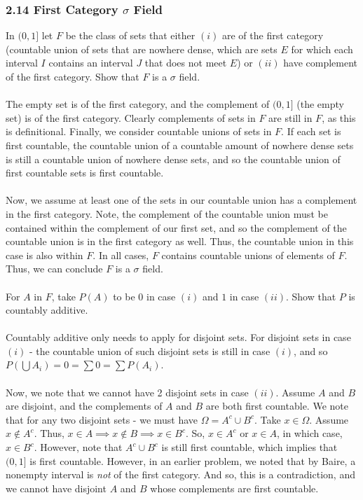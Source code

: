\documentclass[12pt,a4paper]{article}
\newcommand{\1}[1]{\mathbbm{1}\left\{ #1 \right\}}
\begin{document}
\subsubsection{2.14 First Category $\sigma$ Field} In $(0,1]$ let $F$ be the class of sets that either $(i)$ are of the first category (countable union of sets that are nowhere dense, which are sets $E$ for which each interval $I$ contains an interval $J$ that does not meet $E$) or $(ii)$ have complement of the first category. Show that $F$ is a $\sigma$ field.
\\\\
The empty set is of the first category, and the complement of $(0,1]$ (the empty set) is of the first category. Clearly complements of sets in $F$ are still in $F$, as this is definitional. Finally, we consider countable unions of sets in $F$. If each set is first countable, the countable union of a countable amount of nowhere dense sets is still a countable union of nowhere dense sets, and so the countable union of first countable sets is first countable.
\\\\
Now, we assume at least one of the sets in our countable union has a complement in the first category. Note, the complement of the countable union must be contained within the complement of our first set, and so the complement of the countable union is in the first category as well. Thus, the countable union in this case is also within $F$. In all cases, $F$ contains countable unions of elements of $F$. Thus, we can conclude $F$ is a $\sigma$ field.
\\\\
For $A$ in $F$, take $P(A)$ to be $0$ in case $(i)$ and $1$ in case $(ii)$. Show that $P$ is countably additive.
\\\\
Countably additive only needs to apply for disjoint sets. For disjoint sets in case $(i)$ - the countable union of such disjoint sets is still in case $(i)$, and so $P(\bigcup A_i) = 0 = \sum 0 = \sum P(A_i)$.
\\\\
Now, we note that we cannot have 2 disjoint sets in case $(ii)$. Assume $A$ and $B$ are disjoint, and the complements of $A$ and $B$ are both first countable. We note that for any two disjoint sets - we must have $\Omega = A^c \cup B^c$. Take $x \in \Omega$. Assume $x \not\in A^c$. Thus, $x \in A \implies x \not\in B \implies x \in B^c$. So, $x \in A^c$ or $x \in A$, in which case, $x \in B^c$. However, note that $A^c \cup B^c$ is still first countable, which implies that $(0,1]$ is first countable. However, in an earlier problem, we noted that by Baire, a nonempty interval is \textit{not} of the first category. And so, this is a contradiction, and we cannot have disjoint $A$ and $B$ whose complements are first countable.
\end{document}

